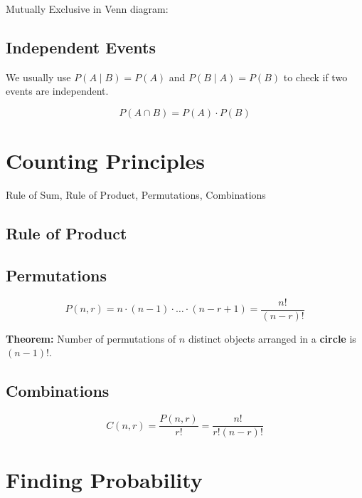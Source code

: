 \documentclass[12pt,a4paper]{article}
\begin{document}
Mutually Exclusive in Venn diagram:


\subsection*{Independent Events}

We usually use $P(A \mid B) = P(A)$ and  $P(B \mid A) = P(B)$ to check
if two events are independent.

\[P(A \cap B) = P(A) \cdot P(B)\]

\section*{Counting Principles}

Rule of Sum, Rule of Product, Permutations, Combinations

\subsection*{Rule of Product}

\subsection*{Permutations}

\[ P(n, r) = n \cdot (n-1) \cdot \dots \cdot (n-r+1) = \frac{n!}{(n-r)!} \]

\textbf{Theorem:} Number of permutations of $n$ distinct objects arranged in a \textbf{circle} is $(n-1)!$.

\subsection*{Combinations}

\[ C(n, r) = \frac{P(n, r)}{r!} = \frac{n!}{r!(n-r)!} \]

\section*{Finding Probability}
\end{document}
